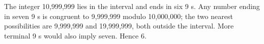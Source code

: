 The integer 10,999,999 lies in the interval and ends in six 9 s. Any number ending in seven 9 s is congruent to 9,999,999 modulo 10,000,000; the two nearest possibilities are 9,999,999 and 19,999,999, both outside the interval. More terminal 9 s would also imply seven. Hence $\boxed6$.
